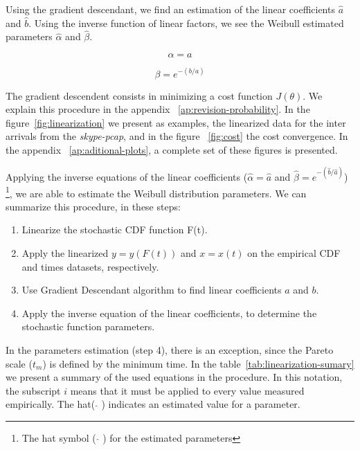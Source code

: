 Using the gradient descendant, we find an estimation of the linear coefficients $\hat{a}$ and $\hat{b}$. Using the inverse function of linear factors, we see the Weibull estimated parameters $\hat{\alpha}$ and $\hat{\beta}$.

\begin{equation}
\alpha = a
\end{equation}

\begin{equation}
\beta = e^{-(b/a)}
\end{equation}

The gradient descendent consists in minimizing a cost function $J(\theta)$. We explain this procedure in the appendix ~\ref{ap:revision-probability}. In the figure~\ref{fig:linearization} we present as examples, the linearized data for the inter arrivals from the \textit{skype-pcap}, and in the figure ~\ref{fig:cost} the cost convergence. In the appendix ~\ref{ap:aditional-plots}, a complete set of these figures is presented.

Applying the inverse equations of the linear coefficients ($\hat{\alpha} = \hat{a}$ and $\hat{\beta} = e^{-(\hat{b}/\hat{a})}$) \footnote{The hat symbol ( $ \widehat{} $ ) for the estimated parameters}, we are able to estimate the Weibull distribution parameters. We can summarize this procedure, in these steps:
\begin{enumerate}
\item Linearize the stochastic CDF function F(t).
\item Apply the linearized $y = y(F(t))$ and  $x = x(t)$ on the empirical CDF and times datasets, respectively. 
\item Use Gradient Descendant algorithm to find linear coefficients $a$ and $b$.
\item Apply the inverse equation of the linear coefficients, to determine the stochastic function parameters.
\end{enumerate}

In the parameters estimation (step 4), there is an exception, since the Pareto scale ($t_{m}$) is defined by the minimum time. In the table~\ref{tab:linearization-sumary} we present a summary of the used equations in the procedure. In this notation, the subscript $i$ means that it must be applied to every value measured empirically. The hat( $\widehat{}$ ) indicates an estimated value for a parameter. 

